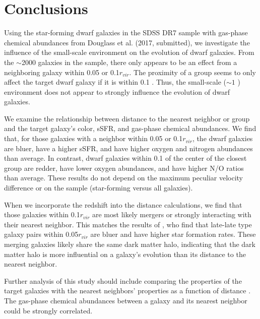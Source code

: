 

\section{Conclusions}

Using the star-forming dwarf galaxies in the SDSS DR7 sample with gas-phase 
chemical abundances from Douglass et al. (2017, submitted), we investigate the 
influence of the small-scale environment on the evolution of dwarf galaxies.  
From the $\sim$2000 galaxies in the sample, there only appears to be an effect 
from a neighboring galaxy within 0.05 \hMpc or 0.1$r_{vir}$.  The proximity of a 
group seems to only affect the target dwarf galaxy if it is within 0.1 \hMpc.  
Thus, the small-scale ($\sim 1$ \hMpc) environment does not appear to strongly 
influence the evolution of dwarf galaxies.

We examine the relationship between distance to the nearest neighbor or group 
and the target galaxy's color, sSFR, and gas-phase chemical abundances.  We find 
that, for those galaxies with a neighbor within 0.05 \hMpc or 0.1$r_{vir}$, the 
dwarf galaxies are bluer, have a higher sSFR, and have higher oxygen and 
nitrogen abundances than average.  In contrast, dwarf galaxies within 0.1 \hMpc 
of the center of the closest group are redder, have lower oxygen abundances, and 
have higher N/O ratios than average.  These results do not depend on the maximum 
peculiar velocity difference or on the sample (star-forming versus all 
galaxies).

When we incorporate the redshift into the distance calculations, we find that 
those galaxies within 0.1$r_{vir}$ are most likely mergers or strongly 
interacting with their nearest neighbor.  This matches the results of 
\cite{Park09}, who find that late-late type galaxy pairs within 0.05$r_{vir}$ 
are bluer and have higher star formation rates.  These merging galaxies likely 
share the same dark matter halo, indicating that the dark matter halo is more 
influential on a galaxy's evolution than its distance to the nearest neighbor.

Further analysis of this study should include comparing the properties of the 
target galaxies with the nearest neighbors' properties as a function of 
distance \citep[``galactic conformity'';][]{Weinmann06}.  The gas-phase chemical 
abundances between a galaxy and its nearest neighbor could be strongly 
correlated.